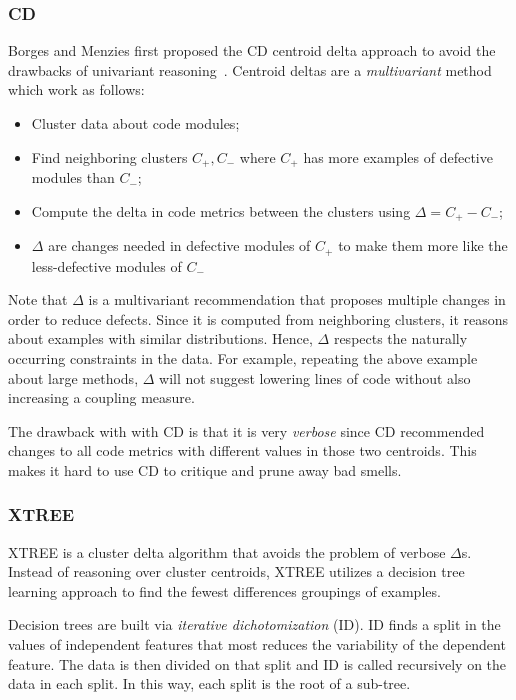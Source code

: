 \documentclass{sig-alternate}
\begin{document}
\subsubsection{CD}
Borges and Menzies first proposed the CD centroid delta approach to avoid the drawbacks of univariant reasoning~\cite{me12c}.
Centroid deltas are a {\em multivariant} method which
work  as follows:
\begin{itemize}
    \item Cluster data about code modules;
    \item Find
neighboring clusters $C_+,C_-$ where $C_+$ has more examples of defective
modules than $C_-$;
\item Compute the  delta   in code metrics between the clusters using \mbox{$\Delta = C_+ - C_-$};
\item $\Delta$ are changes needed in defective modules of $C_+$ to
      make them more like the less-defective modules of $C_-$
\end{itemize}
Note that $\Delta$ is a multivariant recommendation
that proposes multiple changes in order to reduce defects.
Since it is computed
from neighboring clusters, it   reasons about
examples with similar distributions.  Hence,   $\Delta$  respects the naturally occurring constraints in the data. For example,
repeating the above example about large methods,   $\Delta$   will not  suggest lowering lines of code
without also increasing a coupling measure.

The drawback with with CD is that it is very {\em verbose}
since
CD   recommended changes to all code
metrics with different values in those two centroids. 
This makes it hard to use CD to   critique and prune away bad smells.
\subsubsection{XTREE}

  XTREE  is a cluster delta algorithm
  that avoids the problem of verbose $\Delta$s.
  Instead of reasoning over cluster centroids,
  XTREE utilizes a decision tree learning approach
  to find the fewest differences groupings of examples.
  
  Decision trees are built via
  {\em iterative dichotomization} (ID).
  ID   finds  a  split  in  the  values  of  independent  features  that  most  reduces the variability of the dependent feature. The data is then divided on that split
  and ID is called
  recursively on the data in each split. In this way,
  each split is the root of a sub-tree.
  
\end{document}
